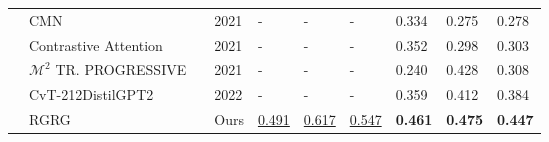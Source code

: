 \documentclass[10pt,twocolumn,letterpaper]{article}
\newcommand*{\MySmallestIndent}{\hspace*{-0.1cm}}
\newcommand*{\MySmallestIndentRight}{\hspace*{0.1cm}}
\begin{document}
\begin{table*}[t!]
{\begin{tabular}{lllllll||lll}
			                           & \cellcolor{Gray} CMN \cite{chen2021cross}                                                        & \cellcolor{Gray}\MySmallestIndentRight\xmark  & \MySmallestIndent \cellcolor{Gray} 2021 & \MySmallestIndent\cellcolor{Gray} -                 & \MySmallestIndent\cellcolor{Gray} -                 & \MySmallestIndent\cellcolor{Gray} -                 & \cellcolor{Gray}0.334          & \cellcolor{Gray}0.275          & \cellcolor{Gray}0.278          \\
			                           & \cellcolor{Gray} Contrastive Attention \cite{liu2021contrastive}                                 & \cellcolor{Gray}\MySmallestIndentRight\xmark  & \MySmallestIndent \cellcolor{Gray} 2021 & \MySmallestIndent\cellcolor{Gray} -                 & \MySmallestIndent\cellcolor{Gray} -                 & \MySmallestIndent\cellcolor{Gray} -                 & \cellcolor{Gray}0.352          & \cellcolor{Gray}0.298          & \cellcolor{Gray}0.303          \\
			                           & \cellcolor{Gray} $\mathcal{M}^{2}$ TR. PROGRESSIVE \cite{nooralahzadeh2021progressive}           & \cellcolor{Gray}\MySmallestIndentRight\xmark  & \MySmallestIndent \cellcolor{Gray} 2021 & \MySmallestIndent\cellcolor{Gray} -                 & \MySmallestIndent\cellcolor{Gray} -                 & \MySmallestIndent\cellcolor{Gray} -                 & \cellcolor{Gray}0.240          & \cellcolor{Gray}0.428          & \cellcolor{Gray}0.308          \\
			                           & \cellcolor{Gray} CvT-21{\large 2}DistilGPT2 \cite{nicolson2022improving}                         & \cellcolor{Gray}\MySmallestIndentRight\xmark  & \MySmallestIndent \cellcolor{Gray} 2022 & \MySmallestIndent\cellcolor{Gray} -                 & \MySmallestIndent\cellcolor{Gray} -                 & \MySmallestIndent\cellcolor{Gray} -                 & \cellcolor{Gray}0.359          & \cellcolor{Gray}0.412          & \cellcolor{Gray}0.384          \\
			\hhline{~|*9{-}|}
			                           & \cellcolor{Gray}RGRG                                                                             & \cellcolor{Gray}\MySmallestIndentRight\xmark  & \MySmallestIndent\cellcolor{Gray} Ours  & \MySmallestIndent\cellcolor{Gray} \underline{0.491} & \MySmallestIndent\cellcolor{Gray} \underline{0.617} & \MySmallestIndent\cellcolor{Gray} \underline{0.547} & \cellcolor{Gray}\textbf{0.461} & \cellcolor{Gray}\textbf{0.475} & \cellcolor{Gray}\textbf{0.447} \\ \hline

\end{tabular}}
\end{table*}
\end{document}

